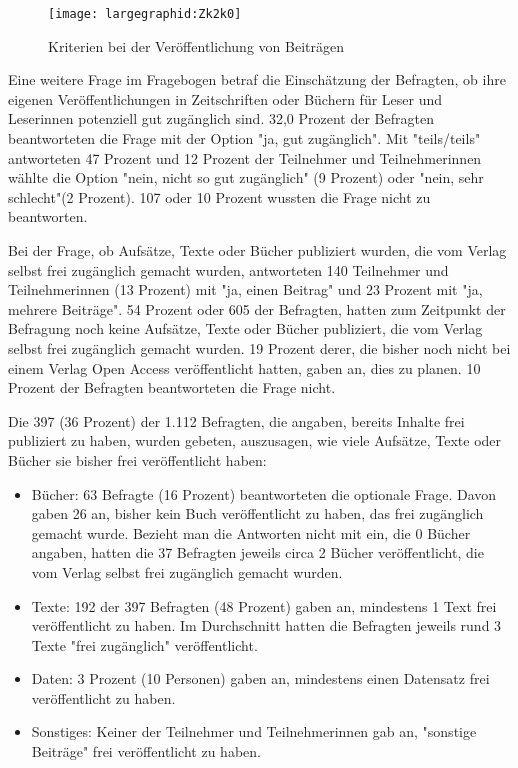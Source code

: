 \begin{figure}[h!]
\texttt{[image: largegraphid:Zk2k0]}
\caption{Kriterien bei der Veröffentlichung von Beiträgen}
\end{figure}

Eine weitere Frage im Fragebogen betraf die Einschätzung der Befragten, ob ihre eigenen Veröffentlichungen in Zeitschriften oder Büchern für Leser und Leserinnen potenziell gut zugänglich sind. 32,0 Prozent der Befragten beantworteten die Frage mit der Option "ja, gut zugänglich". Mit "teils/teils" antworteten 47 Prozent und 12 Prozent der Teilnehmer und Teilnehmerinnen wählte die Option "nein, nicht so gut zugänglich" (9 Prozent) oder "nein, sehr schlecht"(2 Prozent). 107 oder 10 Prozent wussten die Frage nicht zu beantworten.

Bei der Frage, ob Aufsätze, Texte oder Bücher publiziert wurden, die vom Verlag selbst frei zugänglich gemacht wurden, antworteten 140 Teilnehmer und Teilnehmerinnen (13 Prozent) mit "ja, einen Beitrag" und 23 Prozent mit "ja, mehrere Beiträge". 54 Prozent oder 605 der Befragten, hatten zum Zeitpunkt der Befragung noch keine Aufsätze, Texte oder Bücher publiziert, die vom Verlag selbst frei zugänglich gemacht wurden.  19 Prozent derer, die bisher noch nicht bei einem Verlag Open Access veröffentlicht hatten, gaben an, dies zu planen. 10 Prozent der Befragten beantworteten die Frage nicht.

Die 397 (36 Prozent) der 1.112 Befragten, die angaben, bereits Inhalte frei publiziert zu haben, wurden gebeten, auszusagen, wie viele Aufsätze, Texte oder Bücher sie bisher frei veröffentlicht haben:
\begin{itemize}
\item Bücher: 63 Befragte (16 Prozent) beantworteten die optionale Frage. Davon gaben 26 an, bisher kein Buch veröffentlicht zu haben, das frei zugänglich gemacht wurde. Bezieht man die Antworten nicht mit ein, die 0 Bücher angaben, hatten die 37 Befragten jeweils circa 2 Bücher veröffentlicht, die vom Verlag selbst frei zugänglich gemacht wurden.
\item Texte: 192 der 397 Befragten (48 Prozent) gaben an, mindestens 1 Text frei veröffentlicht zu haben. Im Durchschnitt hatten die Befragten jeweils rund 3 Texte "frei zugänglich" veröffentlicht.
\item Daten: 3 Prozent (10 Personen) gaben an, mindestens einen Datensatz frei veröffentlicht zu haben.
\item Sonstiges: Keiner der Teilnehmer und Teilnehmerinnen gab an, "sonstige Beiträge" frei veröffentlicht zu haben.
\end{itemize}

